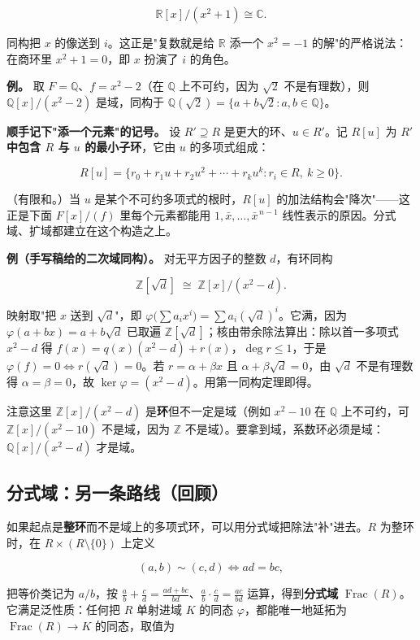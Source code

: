 \[
\mathbb R[x]/(x^2+1)\cong\mathbb C .
\]

同构把 $x$ 的像送到 $i$。这正是"复数就是给 $\mathbb R$ 添一个 $x^2=-1$ 的解"的严格说法：在商环里 $x^2+1=0$，即 $x$ 扮演了 $i$ 的角色。

\textbf{例。} 取 $F=\mathbb Q$、$f=x^2-2$（在 $\mathbb Q$ 上不可约，因为 $\sqrt2$ 不是有理数），则 $\mathbb Q[x]/(x^2-2)$ 是域，同构于 $\mathbb Q(\sqrt2)=\{a+b\sqrt2:a,b\in\mathbb Q\}$。

\textbf{顺手记下"添一个元素"的记号。} 设 $R'\supseteq R$ 是更大的环、$u\in R'$。记 $R[u]$ 为 \textbf{$R'$ 中包含 $R$ 与 $u$ 的最小子环}，它由 $u$ 的多项式组成：

\[
R[u]=\{r_0+r_1u+r_2u^2+\cdots+r_ku^k:r_i\in R,\ k\ge0\}.
\]

（有限和。）当 $u$ 是某个不可约多项式的根时，$R[u]$ 的加法结构会"降次"——这正是下面 $F[x]/(f)$ 里每个元素都能用 $1,\bar x,\dots,\bar x^{\,n-1}$ 线性表示的原因。分式域、扩域都建立在这个构造之上。

\textbf{例（手写稿给的二次域同构）。} 对无平方因子的整数 $d$，有环同构

\[
\mathbb Z[\sqrt d]\;\cong\;\mathbb Z[x]/(x^2-d).
\]

映射取"把 $x$ 送到 $\sqrt d$"，即 $\varphi\bigl(\sum a_ix^i\bigr)=\sum a_i(\sqrt d)^i$。它满，因为 $\varphi(a+bx)=a+b\sqrt d$ 已取遍 $\mathbb Z[\sqrt d]$；核由带余除法算出：除以首一多项式 $x^2-d$ 得 $f(x)=q(x)(x^2-d)+r(x)$，$\deg r\le1$，于是 $\varphi(f)=0\iff r(\sqrt d)=0$。若 $r=\alpha+\beta x$ 且 $\alpha+\beta\sqrt d=0$，由 $\sqrt d$ 不是有理数得 $\alpha=\beta=0$，故 $\ker\varphi=(x^2-d)$。用第一同构定理即得。

注意这里 $\mathbb Z[x]/(x^2-d)$ 是\textbf{环}但不一定是域（例如 $x^2-10$ 在 $\mathbb Q$ 上不可约，可 $\mathbb Z[x]/(x^2-10)$ 不是域，因为 $\mathbb Z$ 不是域）。要拿到域，系数环必须是域：$\mathbb Q[x]/(x^2-d)$ 才是域。

\subsection{分式域：另一条路线（回顾）}


如果起点是\textbf{整环}而不是域上的多项式环，可以用分式域把除法"补"进去。$R$ 为整环时，在 $R\times(R\setminus\{0\})$ 上定义

\[
(a,b)\sim(c,d)\iff ad=bc,
\]

把等价类记为 $a/b$，按 $\frac ab+\frac cd=\frac{ad+bc}{bd}$、$\frac ab\cdot\frac cd=\frac{ac}{bd}$ 运算，得到\textbf{分式域} $\operatorname{Frac}(R)$。它满足泛性质：任何把 $R$ 单射进域 $K$ 的同态 $\varphi$，都能唯一地延拓为 $\operatorname{Frac}(R)\to K$ 的同态，取值为

